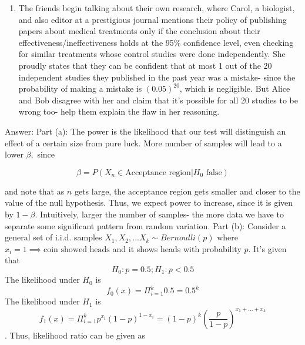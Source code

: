 \documentclass[12pt, oneside]{article}
\begin{document}
\begin{enumerate}
\begin{enumerate}
    \item The friends begin talking about their own research, where Carol, a biologist, and also editor at a prestigious journal mentions their policy of publishing papers about medical treatments only if the conclusion about their effectiveness/ineffectiveness holds at the 95\% confidence level, even checking for similar treatments whose control studies were done independently. She proudly states that they can be confident that at most 1 out of the 20 independent studies they published in the past year was a mistake- since the probability of making a mistake is $(0.05)^{20}$, which is negligible. But Alice and Bob disagree with her and claim that it's possible for all 20 studies to be wrong too- help them explain the flaw in her reasoning. 
    

\end{enumerate}
Answer:
\newline Part (a): The power is the likelihood that our test will distinguish an effect of a certain size from pure luck. More number of samples will lead to a lower $\beta,$ since 

$$\beta = P(X_n \in \text{Acceptance region} | H_0 \text{ false})$$

and note that as $n$ gets large, the acceptance region gets smaller and closer to the value of the null hypothesis. Thus, we expect power to increase, since it is given by $1-\beta.$ Intuitively, larger the number of samples- the more data we have to separate some significant pattern from random variation. 
\newline Part (b): Consider a general set of i.i.d. samples $X_1,X_2,...X_k \sim Bernoulli(p)$ where $x_i = 1 \implies \text{coin showed heads}$ and it shows heads with probability $p$. It's given that 
$$H_0 : p = 0.5; H_1 : p < 0.5$$
The likelihood under $H_0$ is $$
f_0(x) = \Pi_{i=1}^{k} 0.5 = 0.5^k 
$$
The likelihood under $H_1$ is $$f_1(x) = \Pi_{i=1}^{k} p^{x_i} (1-p)^{1-x_i}= (1-p)^{k} (\dfrac{p}{1-p})^{x_1+...+x_k}$$.
Thus, likelihood ratio can be given as 


\end{enumerate}
\end{document}
